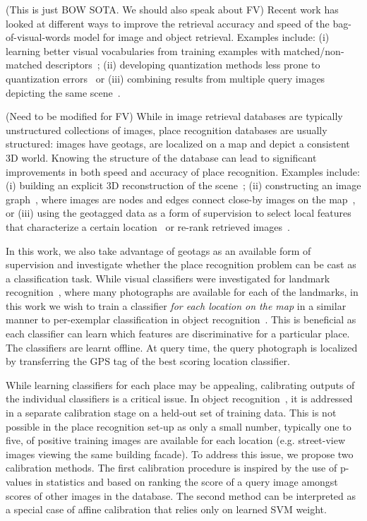    \textcolor{myGrey}{(This is just BOW SOTA. We should also speak about FV)}
   Recent work has looked at different ways to improve the retrieval accuracy and speed of the bag-of-visual-words model for image and object retrieval. Examples include: 
   (i) learning better visual vocabularies from training examples with matched/non-matched descriptors~\cite{Mikulik2010,Philbin10b}; 
   (ii)  developing quantization methods less prone to quantization errors~\cite{Jegou2011,Philbin08} or 
   (iii) combining results from multiple query images depicting the same scene~\cite{Chum11,Chum07b}.

   \textcolor{myGrey}{ (Need to be modified for FV)
   While in image retrieval  databases are typically unstructured collections of images, place recognition databases are usually structured: images have geotags, are localized on a map and depict a consistent 3D world. %
   Knowing the structure of the database can lead to significant improvements in both speed and accuracy of place recognition. 
   Examples include: (i) building an explicit 3D reconstruction of the scene~\cite{Irschara2009,Li10,Li12}; (ii) constructing an image graph~\cite{Philbin10c,Turcot09}, where images are nodes and edges connect close-by images on the map~\cite{Torii11}, or (iii) using the geotagged data as a form of supervision to select local features that characterize a certain location~\cite{Knopp2010,Schindler07} or re-rank retrieved images~\cite{Zamir10}.
   }

   In this work, we also take advantage of geotags as an available form of supervision and investigate whether the place recognition problem can be cast as a classification task.
   While visual classifiers were investigated for landmark recognition~\cite{Li09}, where many photographs are available for each of the landmarks, in this work we wish to train a classifier {\em for each location on the map} in a similar manner to per-exemplar classification in object recognition~\cite{Malisiewicz11}. This is beneficial as  each classifier can learn which features are discriminative for a particular place. %
   The classifiers are learnt offline. At query time, the query photograph is localized by transferring the GPS tag of the best scoring location classifier.

   While learning classifiers for each place may be appealing, calibrating outputs of the individual classifiers is a critical issue. In object recognition~\cite{Malisiewicz11}, it is addressed in a separate calibration stage on a held-out set of training data.
   This is not possible in the place recognition set-up as only a small number, typically one to five, of positive training images are available for each location (e.g. street-view images viewing the same building facade). To address this issue, we propose two calibration methods. The first calibration procedure is inspired by the use of p-values in statistics and based on ranking the score of a query image amongst scores of other images in the database. The second method can be interpreted as a special case of affine calibration that relies only on learned SVM weight.

